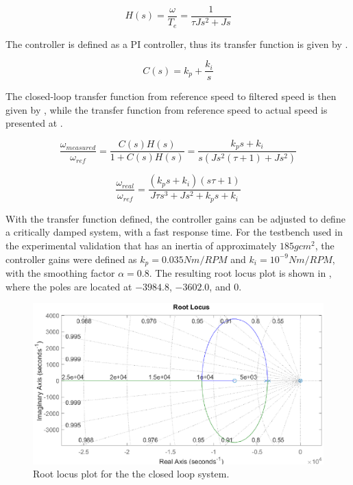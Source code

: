 \begin{equation}
		H(s) = \frac{\omega}{T_e} = \frac{1}{\tau J s^2+J s}
	\label{eq:plant_speed_controller}
\end{equation}

The controller is defined as a PI controller, thus its transfer function is given by .

\begin{equation}
		C(s) = k_p + \frac{k_i}{s}
	\label{eq:controller_speed}
\end{equation}

The closed-loop transfer function from reference speed to filtered speed is then given by , while the transfer function from reference speed to actual speed is presented at .

\begin{equation}
		\frac{\omega_{measured}}{\omega_{ref}} = \frac{C(s) H(s)}{1+C(s) H(s)} = 
		\frac{k_p s + k_i}{s (J s^2 (\tau + 1) + J s^2)}
	\label{eq:closed_loop_speed}
\end{equation}

\begin{equation}
		\frac{\omega_{real}}{\omega_{ref}} = \frac{(k_p s + k_i)(s\tau + 1)}{J\tau s^3 + J s^2 + k_p s + k_i}
		\label{eq:closed_loop_speed_actual}
\end{equation}

With the transfer function defined, the controller gains can be adjusted to define a critically damped system, with a fast response time. For the testbench used in the experimental validation that has an inertia of approximately $185 g cm^2$, the controller gains were defined as $k_p = 0.035Nm/RPM$ and $k_i = 10^{-9} Nm/RPM$, with the smoothing factor $\alpha = 0.8$. The resulting root locus plot is shown in , where the poles are located at $-3984.8$, $-3602.0$, and $0$.

\begin{figure}[!htb]
	\centering
	\includegraphics[width=1\textwidth]{Figures/rlocus_speed.eps}
	\caption[Root locus plot for the closed loop system.]{Root locus plot for the the closed loop system.}
	\label{fig:root_locus_speed}%
\end{figure}